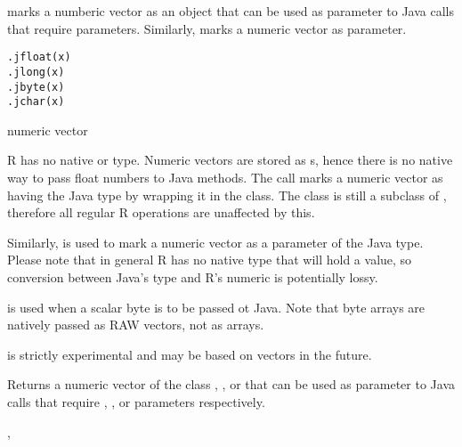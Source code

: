 \begin{Description}\relax
{} marks a numberic vector as an object that can be used
as parameter to Java calls that require  parameters.
Similarly,  marks a numeric vector as  parameter.
\end{Description}
\begin{Usage}
\begin{verbatim}
.jfloat(x)
.jlong(x)
.jbyte(x)
.jchar(x)
\end{verbatim}
\end{Usage}
\begin{Arguments}
\begin{ldescription}
\item[\code{x}] numeric vector
\end{ldescription}
\end{Arguments}
\begin{Details}\relax
R has no native  or  type. Numeric vectors are
stored as s, hence there is no native way to pass float
numbers to Java methods. The  call marks a numeric
vector as having the Java type  by wrapping it in the
 class. The class is still a subclass of ,
therefore all regular R operations are unaffected by this.

Similarly,  is used to mark a numeric vector as a
parameter of the  Java type. Please note that in general R
has no native type that will hold a  value, so conversion
between Java's  type and R's numeric is potentially lossy.

 is used when a scalar byte is to be passed ot Java. Note
that byte arrays are natively passed as RAW vectors, not as
 arrays.

 is strictly experimental and may be based on
 vectors in the future.
\end{Details}
\begin{Value}
Returns a numeric vector of the class , ,
 or 
that can be used as parameter to Java calls that require
, ,  or  parameters
respectively.
\end{Value}
\begin{SeeAlso}\relax
{}, 
\end{SeeAlso}


